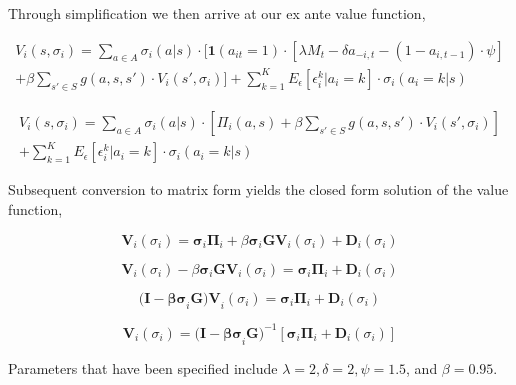 \documentclass{article}
\begin{document}
\noindent Through simplification we then arrive at our ex ante value function,

\begin{equation}
\begin{split}
V_i(s,\sigma_i)=\sum_{a \in A} \sigma_i(a|s) \cdot [ \mathbf{1} (a_{it}=1) \cdot [ \lambda M_t - \delta a_{-i,t} - (1-a_{i,t-1}) \cdot \psi ] \\ + \beta \sum_{s' \in S} g(a,s,s') \cdot V_i(s',\sigma_i) ] + \sum_{k=1} ^K E_{\epsilon} [ \epsilon_i ^k | a_i = k ] \cdot \sigma_i(a_i=k|s)
\end{split}
\end{equation}

\begin{equation}
\begin{split}
V_i(s,\sigma_i)=\sum_{a \in A} \sigma_i(a|s) \cdot [ \Pi_i(a,s) + \beta \sum_{s' \in S} g(a,s,s') \cdot V_i(s',\sigma_i) ] \\ + \sum_{k=1} ^K E_{\epsilon} [ \epsilon_i ^k | a_i = k ] \cdot \sigma_i(a_i=k|s)
\end{split}
\end{equation}

\noindent Subsequent conversion to matrix form yields the closed form solution of the value function,

\begin{equation}
\mathbf{V}_i(\sigma_i)=\mathbf{\sigma}_i \mathbf{\Pi}_i + \beta \mathbf{\sigma}_i \mathbf{GV}_i(\sigma_i) + \mathbf{D}_i(\sigma_i)
\end{equation}

\begin{equation}
\mathbf{V}_i(\sigma_i) - \beta \mathbf{\sigma}_i \mathbf{GV}_i(\sigma_i) =\mathbf{\sigma}_i \mathbf{\Pi}_i + \mathbf{D}_i(\sigma_i)
\end{equation}

\begin{equation}
\mathbf{(I - \beta \mathbf{\sigma}}_i \mathbf{G) V}_i(\sigma_i) =\mathbf{\sigma}_i \mathbf{\Pi}_i + \mathbf{D}_i(\sigma_i)
\end{equation}

\begin{equation}
\mathbf{V}_i(\sigma_i) = \mathbf{(I - \beta \mathbf{\sigma}}_i \mathbf{G})^{-1} [\mathbf{\sigma}_i \mathbf{\Pi}_i + \mathbf{D}_i(\sigma_i)]
\end{equation}

\noindent Parameters that have been specified include $\lambda=2, \delta=2, \psi=1.5$, and $\beta=0.95$.
\end{document}
